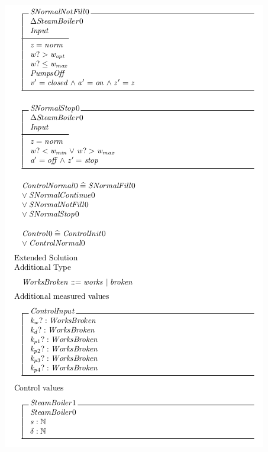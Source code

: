 \begin{center}
    \noindent \includegraphics[scale=0.8]{examples/steamboiler/0d.png}
\end{center}

